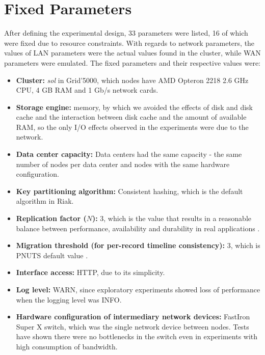 \documentclass[man,floatsintext,12pt]{apa6}
\begin{document}
\section{Fixed Parameters}

After defining the experimental design, 33 parameters were listed, 16 of which
were fixed due to resource constraints. With regards to network parameters, the
values of LAN parameters were the actual values found in the cluster, while WAN
parameters were emulated. The fixed parameters and their respective values
were:

\begin{itemize}

\item \textbf{Cluster:} \textit{sol} in Grid'5000, which nodes have AMD Opteron
2218 2.6 GHz CPU, 4 GB RAM and 1 Gb/s network cards.

\item \textbf{Storage engine:} memory, by which we avoided the effects of disk
and disk cache and the interaction between disk cache and the amount of
available RAM, so the only I/O effects observed in the experiments were due to
the network.

\item \textbf{Data center capacity:} Data centers had the same capacity - the
same number of nodes per data center and nodes with the same hardware
configuration.

\item \textbf{Key partitioning algorithm:} Consistent hashing, which is the
default algorithm in Riak.

\item \textbf{Replication factor ($ N $):} 3, which is the value that results
in a reasonable balance between performance, availability and durability in
real applications \parencite{DeCandia2007}.

\item \textbf{Migration threshold (for per-record timeline consistency):} 3,
which is PNUTS default value \parencite{Cooper2008}.

\item \textbf{Interface access:} HTTP, due to its simplicity.

\item \textbf{Log level:} WARN, since exploratory experiments showed loss of
performance when the logging level was INFO.

\item \textbf{Hardware configuration of intermediary network devices:} FastIron
Super X switch, which was the single network device between nodes. Tests have
shown there were no bottlenecks in the switch even in experiments with high
consumption of bandwidth.


\end{itemize}
\end{document}
